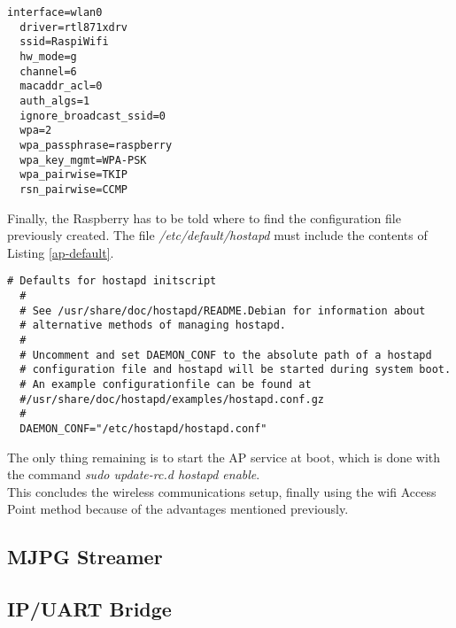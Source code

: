 	\begin{minipage}{\linewidth}%
	\begin{lstlisting}[label=ap-config,caption=AP Configuration {[} /etc/hostapd/hostapd.conf {]}  ]
  interface=wlan0
  driver=rtl871xdrv
  ssid=RaspiWifi
  hw_mode=g
  channel=6
  macaddr_acl=0
  auth_algs=1
  ignore_broadcast_ssid=0
  wpa=2
  wpa_passphrase=raspberry
  wpa_key_mgmt=WPA-PSK
  wpa_pairwise=TKIP
  rsn_pairwise=CCMP

  	\end{lstlisting}
	\end{minipage}

\bigskip
Finally, the Raspberry has to be told where to find the configuration file previously created. The file \textit{/etc/default/hostapd} must include the contents of Listing \ref{ap-default}.

	\begin{minipage}{\linewidth}%
	\begin{lstlisting}[label=ap-default,caption=AP Defaults {[} /etc/default/hostapd {]}  ]
  # Defaults for hostapd initscript
  #
  # See /usr/share/doc/hostapd/README.Debian for information about
  # alternative methods of managing hostapd.
  #
  # Uncomment and set DAEMON_CONF to the absolute path of a hostapd 
  # configuration file and hostapd will be started during system boot. 
  # An example configurationfile can be found at 
  #/usr/share/doc/hostapd/examples/hostapd.conf.gz
  #
  DAEMON_CONF="/etc/hostapd/hostapd.conf"

	\end{lstlisting}
	\end{minipage}

\bigskip
The only thing remaining is to start the AP service at boot, which is done with the command \textit{sudo update-rc.d hostapd enable}.\\


This concludes the wireless communications setup, finally using the wifi Access Point method because of the advantages mentioned previously.


\subsection{MJPG Streamer}




\subsection{IP/UART Bridge} 




